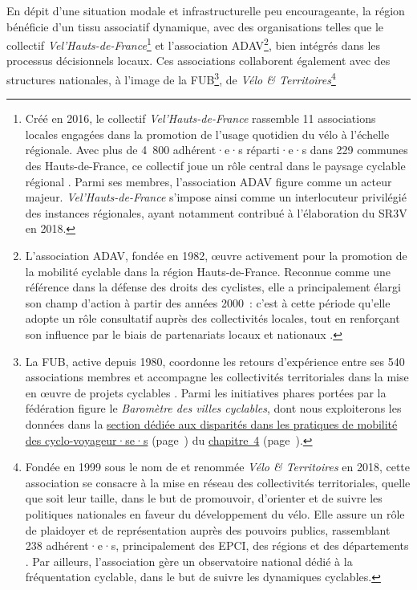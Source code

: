 \begin{refsegment}
En dépit d'une situation modale et infrastructurelle peu encourageante, la région bénéficie d’un tissu associatif dynamique, avec des organisations telles que le collectif \textsl{Vel'Hauts-de-France}\footnote{
    Créé en 2016, le collectif \textsl{Vel'Hauts-de-France} rassemble 11 associations locales engagées dans la promotion de l'usage quotidien du vélo à l'échelle régionale. Avec plus de 4~800 adhérent·e·s réparti·e·s dans 229 communes des Hauts-de-France, ce collectif joue un rôle central dans le paysage cyclable régional \textcolor{blue}{\autocite{velhauts-de-france_collectif_2023}}. Parmi ses membres, l’association \acrfull{ADAV} figure comme un acteur majeur. \textsl{Vel'Hauts-de-France} s’impose ainsi comme un interlocuteur privilégié des instances régionales, ayant notamment contribué à l’élaboration du \acrfull{SR3V} en 2018.
} et l’association \acrfull{ADAV}\footnote{
    L'association \acrfull{ADAV}, fondée en 1982, œuvre activement pour la promotion de la mobilité cyclable dans la région Hauts-de-France. Reconnue comme une référence dans la défense des droits des cyclistes, elle a principalement élargi son champ d’action à partir des années 2000~: c’est à cette période qu’elle adopte un rôle consultatif auprès des collectivités locales, tout en renforçant son influence par le biais de partenariats locaux et nationaux \textcolor{blue}{\autocite{adav_qui_2016}}.
}, bien intégrés dans les processus décisionnels locaux. Ces associations collaborent également avec des structures nationales, à l'image de la \acrfull{FUB}\footnote{
    La \acrfull{FUB}, active depuis 1980, coordonne les retours d'expérience entre ses 540 associations membres et accompagne les collectivités territoriales dans la mise en œuvre de projets cyclables \textcolor{blue}{\autocite{fub_nos_nodate}}. Parmi les initiatives phares portées par la fédération figure le \textsl{Baromètre des villes cyclables}, dont nous exploiterons les données dans la \hyperref[chap4:source-barometre-fub]{section dédiée aux disparités dans les pratiques de mobilité des cyclo-voyageur·se·s} (page~\pageref{chap4:source-barometre-fub}) du \hyperref[chap4:titre]{chapitre~4} (page~\pageref{chap4:titre}).
}, de \textsl{Vélo \& Territoires}\footnote{
    Fondée en 1999 sous le nom de  et renommée \textsl{Vélo \& Territoires} en 2018, cette association se consacre à la mise en réseau des collectivités territoriales, quelle que soit leur taille, dans le but de promouvoir, d'orienter et de suivre les politiques nationales en faveur du développement du vélo. Elle assure un rôle de plaidoyer et de représentation auprès des pouvoirs publics, rassemblant 238 adhérent·e·s, principalement des \acrshort{EPCI}, des régions et des départements \textcolor{blue}{\autocite{velo__territoires_presentation_2024}}. Par ailleurs, l’association gère un observatoire national dédié à la fréquentation cyclable, dans le but de suivre les dynamiques cyclables.
}
\end{refsegment}
